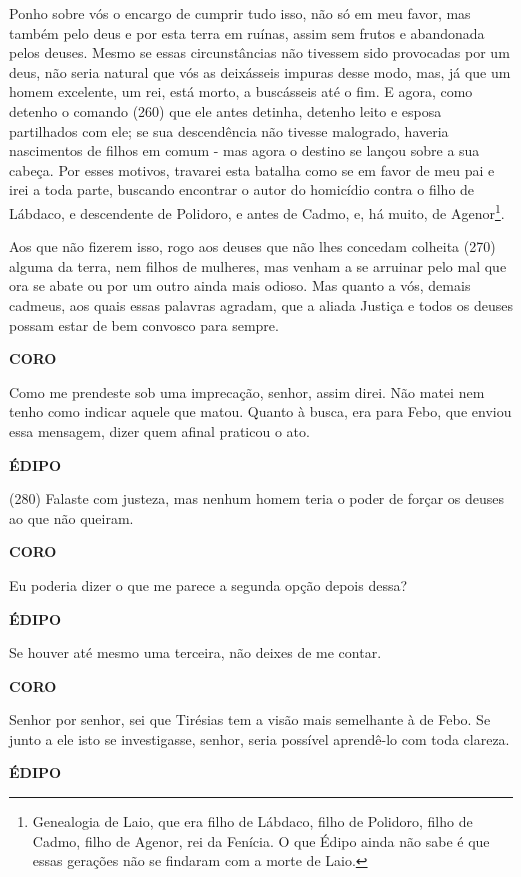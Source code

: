 Ponho sobre vós o encargo de cumprir tudo isso, não só em meu favor, mas
também pelo deus e por esta terra em ruínas, assim sem frutos e
abandonada pelos deuses. Mesmo se essas circunstâncias não tivessem sido
provocadas por um deus, não seria natural que vós as deixásseis impuras
desse modo, mas, já que um homem excelente, um rei, está morto, a
buscásseis até o fim. E agora, como detenho o comando (260) que ele
antes detinha, detenho leito e esposa partilhados com ele; se sua
descendência não tivesse malogrado, haveria nascimentos de filhos em
comum - mas agora o destino se lançou sobre a sua cabeça. Por esses
motivos, travarei esta batalha como se em favor de meu pai e irei a toda
parte, buscando encontrar o autor do homicídio contra o filho de
Lábdaco, e descendente de Polidoro, e antes de Cadmo, e, há muito, de
Agenor\footnote{Genealogia de Laio, que era filho de Lábdaco, filho de
  Polidoro, filho de Cadmo, filho de Agenor, rei da Fenícia. O que Édipo
  ainda não sabe é que essas gerações não se findaram com a morte de
  Laio.}.

Aos que não fizerem isso, rogo aos deuses que não lhes concedam colheita
(270) alguma da terra, nem filhos de mulheres, mas venham a se arruinar
pelo mal que ora se abate ou por um outro ainda mais odioso. Mas quanto
a vós, demais cadmeus, aos quais essas palavras agradam, que a aliada
Justiça e todos os deuses possam estar de bem convosco para sempre.

\textbf{CORO}

Como me prendeste sob uma imprecação, senhor, assim direi. Não matei nem
tenho como indicar aquele que matou. Quanto à busca, era para Febo, que
enviou essa mensagem, dizer quem afinal praticou o ato.

\textbf{ÉDIPO }

(280) Falaste com justeza, mas nenhum homem teria o poder de forçar os
deuses ao que não queiram.

\textbf{CORO}

Eu poderia dizer o que me parece a segunda opção depois dessa?

\textbf{ÉDIPO}

Se houver até mesmo uma terceira, não deixes de me contar.

\textbf{CORO}

Senhor por senhor, sei que Tirésias tem a visão mais semelhante à de
Febo. Se junto a ele isto se investigasse, senhor, seria possível
aprendê-lo com toda clareza.

\textbf{ÉDIPO}

